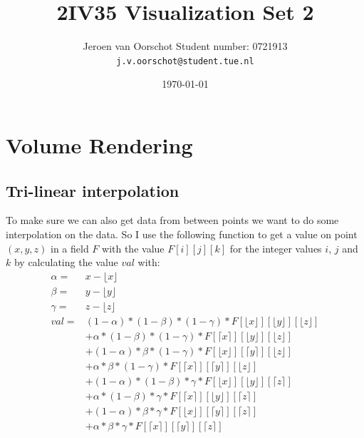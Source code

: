 \documentclass[a4paper,twoside,11pt]{article}
\title{\vspace{-\baselineskip}\sffamily\bfseries 2IV35 Visualization Set 2}
\author{Jeroen van Oorschot \qquad Student number: 0721913 \\{\tt j.v.oorschot@student.tue.nl}}
\date{\today}
\begin{document}
\maketitle

\pagebreak
\tableofcontents
\newpage
\section{Volume Rendering}
\subsection{Tri-linear interpolation}
To make sure we can also get data from between points we want to do some interpolation on the data. So I use the following function to get a value on point $(x,y,z)$ in a field $F$ with the value $F[i][j][k]$ for the integer values $i$, $j$ and $k$ by calculating the value $val$ with:
\begin{eqnarray*}
\alpha =& x-\lfloor x \rfloor\\
\beta =& y-\lfloor y \rfloor\\
\gamma =& z-\lfloor z \rfloor\\
val =& (1 - \alpha) * (1 - \beta) * (1 - \gamma ) * F[\lfloor x \rfloor][\lfloor y \rfloor][\lfloor z \rfloor] \\
&+ \alpha * (1 - \beta) * (1 - \gamma ) * F[\lceil x \rceil][\lfloor y \rfloor][\lfloor z \rfloor]\\
                    &+ (1 - \alpha) * \beta * (1 - \gamma ) * F[\lfloor x \rfloor][\lceil y \rceil][\lfloor z \rfloor] \\
                    &+ \alpha * \beta * (1 - \gamma ) * F[\lceil x \rceil][\lceil y \rceil][\lfloor z \rfloor]\\
                    &+ (1 - \alpha) * (1 - \beta) * \gamma  * F[\lfloor x \rfloor][\lfloor y \rfloor][\lceil z \rceil] \\
                    &+ \alpha * (1 - \beta) * \gamma  * F[\lceil x \rceil][\lfloor y \rfloor][\lceil z \rceil]\\
                    &+ (1 - \alpha) * \beta * \gamma  * F[\lfloor x \rfloor][\lceil y \rceil][\lceil z \rceil] \\
                    &+ \alpha * \beta * \gamma  * F[\lceil x \rceil][\lceil y \rceil][\lceil z \rceil]
\end{eqnarray*}
\end{document}
